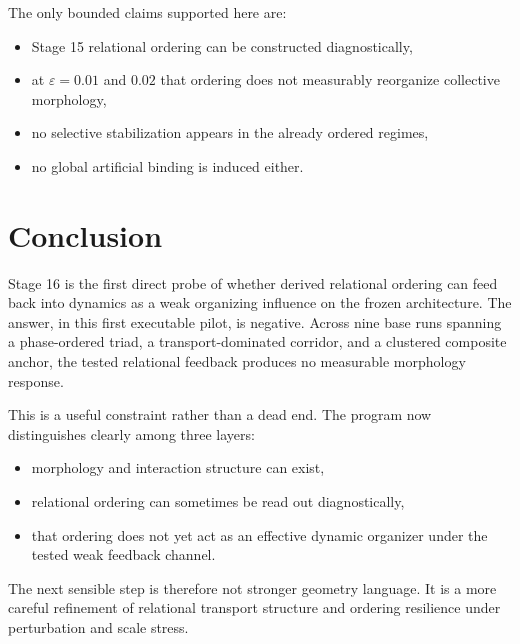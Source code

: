 \documentclass[11pt]{article}
\begin{document}
The only bounded claims supported here are:
\begin{itemize}
\item Stage 15 relational ordering can be constructed diagnostically,
\item at $\varepsilon=0.01$ and $0.02$ that ordering does not measurably reorganize collective morphology,
\item no selective stabilization appears in the already ordered regimes,
\item no global artificial binding is induced either.
\end{itemize}

\section{Conclusion}

Stage 16 is the first direct probe of whether derived relational ordering can feed back into dynamics as a weak organizing influence on the frozen architecture. The answer, in this first executable pilot, is negative. Across nine base runs spanning a phase-ordered triad, a transport-dominated corridor, and a clustered composite anchor, the tested relational feedback produces no measurable morphology response.

This is a useful constraint rather than a dead end. The program now distinguishes clearly among three layers:
\begin{itemize}
\item morphology and interaction structure can exist,
\item relational ordering can sometimes be read out diagnostically,
\item that ordering does not yet act as an effective dynamic organizer under the tested weak feedback channel.
\end{itemize}

The next sensible step is therefore not stronger geometry language. It is a more careful refinement of relational transport structure and ordering resilience under perturbation and scale stress.
\end{document}
